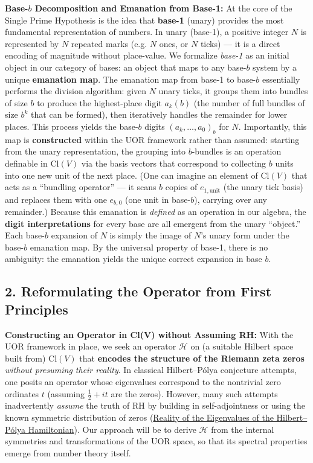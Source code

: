\documentclass{article}
\begin{document}
\textbf{Base-$b$ Decomposition and Emanation from Base-1:} At the core of the Single Prime Hypothesis is the idea that \textbf{base-1} (unary) provides the most fundamental representation of numbers. In unary (base-1), a positive integer $N$ is represented by $N$ repeated marks (e.g. $N$ ones, or $N$ ticks) --- it is a direct encoding of magnitude without place-value. We formalize \emph{base-1} as an initial object in our category of bases: an object that maps to any base-$b$ system by a unique \textbf{emanation map}. The emanation map from base-1 to base-$b$ essentially performs the division algorithm: given $N$ unary ticks, it groups them into bundles of size $b$ to produce the highest-place digit $a_{k}(b)$ (the number of full bundles of size $b^k$ that can be formed), then iteratively handles the remainder for lower places. This process yields the base-$b$ digits $(a_{k},\dots,a_0)_b$ for $N$. Importantly, this map is \textbf{constructed} within the UOR framework rather than assumed: starting from the unary representation, the grouping into $b$-bundles is an operation definable in $\mathrm{Cl}(V)$ via the basis vectors that correspond to collecting $b$ units into one new unit of the next place. (One can imagine an element of $\mathrm{Cl}(V)$ that acts as a “bundling operator” --- it scans $b$ copies of $e_{1,\text{unit}}$ (the unary tick basis) and replaces them with one $e_{b,0}$ (one unit in base-$b$), carrying over any remainder.) Because this emanation is \emph{defined} as an operation in our algebra, the \textbf{digit interpretations} for every base are all emergent from the unary “object.” Each base-$b$ expansion of $N$ is simply the image of $N$’s unary form under the base-$b$ emanation map. By the universal property of base-1, there is no ambiguity: the emanation yields the unique correct expansion in base $b$.

\subsection*{2. Reformulating the Operator from First Principles}

\textbf{Constructing an Operator in Cl(V) without Assuming RH:} With the UOR framework in place, we seek an operator $\mathcal{H}$ on (a suitable Hilbert space built from) $\mathrm{Cl}(V)$ that \textbf{encodes the structure of the Riemann zeta zeros} \emph{without presuming their reality}. In classical Hilbert--P\'olya conjecture attempts, one posits an operator whose eigenvalues correspond to the nontrivial zero ordinates $t$ (assuming $\frac12+it$ are the zeros). However, many such attempts inadvertently \emph{assume} the truth of RH by building in self-adjointness or using the known symmetric distribution of zeros (\href{https://arxiv.org/html/2408.15135v4#:~:text=Essentially%2C%20the%20HPC%20involves%20two,Yakaboylu%20(2024),%20we%20introduce}{Reality of the Eigenvalues of the Hilbert--P\'olya Hamiltonian}). Our approach will be to derive $\mathcal{H}$ from the internal symmetries and transformations of the UOR space, so that its spectral properties emerge from number theory itself.
\end{document}
